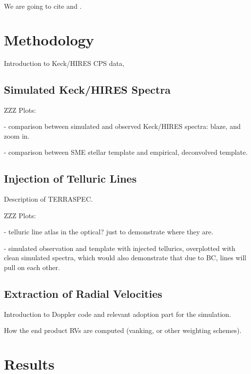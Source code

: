 \documentclass{emulateapj}
\begin{document}
\begin{CJK*}{UTF8}{gbsn}
We are going to cite \cite{artigau2014, cunha2014} and \cite{hitran2013}.


\section{Methodology}\label{sec:method}

Introduction to Keck/HIRES CPS data,


\subsection{Simulated Keck/HIRES Spectra}

ZZZ Plots:

- comparison between simulated and observed Keck/HIRES spectra: blaze,
and zoom in.

- comparison between SME stellar template and empirical, deconvolved
template.


\subsection{Injection of Telluric Lines}

Description of TERRASPEC.

ZZZ Plots:

- telluric line atlas in the optical? just to demonstrate where they are.

- simulated observation and template with injected tellurics,
overplotted with clean simulated spectra, which would also demonstrate
that due to BC, lines will pull on each other.


\subsection{Extraction of Radial Velocities}

Introduction to Doppler code and relevant adoption part for the
simulation.

How the end product RVs are computed (vanking, or other weighting schemes).


\section{Results}



\end{CJK*}
\end{document}
